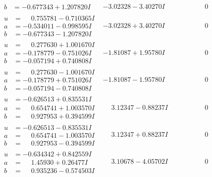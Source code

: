 \documentclass[1p]{elsarticle_modified}
\theoremstyle{definition}
\begin{document}
$$\begin{array}{c|c|c}
\begin{aligned}
b &= -0.677343 + 1.207820 I\end{aligned}
 & -3.02328 - 3.40270 I & \phantom{-0.000000 } 0 \\ \hline\begin{aligned}
u &= \phantom{-}0.755781 - 0.710365 I \\
a &= -0.534011 - 0.998595 I \\
b &= -0.677343 - 1.207820 I\end{aligned}
 & -3.02328 + 3.40270 I & \phantom{-0.000000 } 0 \\ \hline\begin{aligned}
u &= \phantom{-}0.277630 + 1.001670 I \\
a &= -0.178779 - 0.751026 I \\
b &= -0.057194 + 0.740808 I\end{aligned}
 & -1.81087 + 1.95780 I & \phantom{-0.000000 } 0 \\ \hline\begin{aligned}
u &= \phantom{-}0.277630 - 1.001670 I \\
a &= -0.178779 + 0.751026 I \\
b &= -0.057194 - 0.740808 I\end{aligned}
 & -1.81087 - 1.95780 I & \phantom{-0.000000 } 0 \\ \hline\begin{aligned}
u &= -0.626513 + 0.835531 I \\
a &= \phantom{-}0.654741 + 1.003570 I \\
b &= \phantom{-}0.927953 + 0.394599 I\end{aligned}
 & \phantom{-}3.12347 - 0.88237 I & \phantom{-0.000000 } 0 \\ \hline\begin{aligned}
u &= -0.626513 - 0.835531 I \\
a &= \phantom{-}0.654741 - 1.003570 I \\
b &= \phantom{-}0.927953 - 0.394599 I\end{aligned}
 & \phantom{-}3.12347 + 0.88237 I & \phantom{-0.000000 } 0 \\ \hline\begin{aligned}
u &= -0.634342 + 0.842559 I \\
a &= \phantom{-}1.45930 + 0.26477 I \\
b &= \phantom{-}0.935236 - 0.574503 I\end{aligned}
 & \phantom{-}3.10678 - 4.05702 I & \phantom{-0.000000 } 0 \\ \hline\begin{aligned}

\end{aligned}
\end{array}$$
\end{document}

